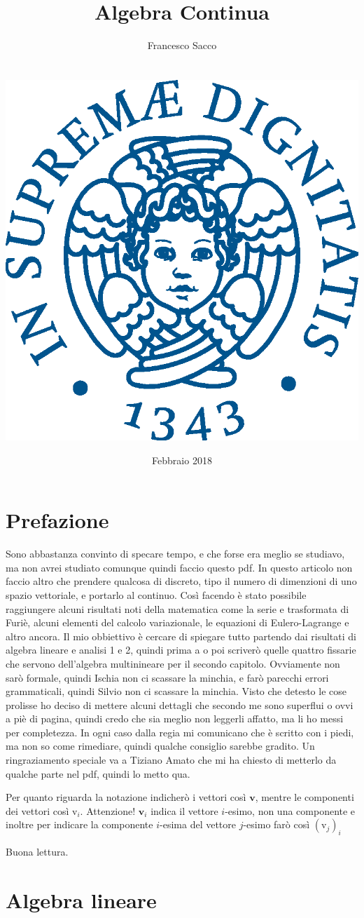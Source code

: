 \documentclass[11pt,a4paper]{report}
\date{{\LARGE Febbraio 2018}}
\title{{\myfont Algebra Continua}}
\author{{\Huge Francesco Sacco}\\ \\ \\
		\includegraphics[scale=0.6]{Immagini/cherubino.eps}\\}
\newcommand{\vettore}[1]{\mathbf{#1}}
\newcommand{\vettorec}[1]{\textrm{#1}}
\theoremstyle{definition}
\theoremstyle{plain}
\theoremstyle{plain}
\begin{document}
	\maketitle
	\tableofcontents
	\chapter*{Prefazione}
		Sono abbastanza convinto di specare tempo, e che forse era meglio se studiavo, ma non avrei studiato comunque quindi faccio questo pdf.\newline
		In questo articolo non faccio altro che prendere qualcosa di discreto, tipo il numero di dimenzioni di uno spazio vettoriale, e portarlo al continuo. Così facendo è stato possibile raggiungere alcuni risultati noti della matematica come la serie e trasformata di Furiè, alcuni elementi del calcolo variazionale, le equazioni di Eulero-Lagrange e altro ancora.\newline
		Il mio obbiettivo è cercare di spiegare tutto partendo dai risultati di algebra lineare e analisi 1 e 2, quindi prima a o poi scriverò quelle quattro fissarie che servono dell'algebra multinineare per il secondo capitolo.\newline
		Ovviamente non sarò formale, quindi Ischia non ci scassare la minchia, e farò parecchi errori grammaticali, quindi Silvio non ci scassare la minchia.\newline
		Visto che detesto le cose prolisse ho deciso di mettere alcuni dettagli che secondo me sono superflui o ovvi a piè di pagina, quindi credo che sia meglio non leggerli affatto, ma li ho messi per completezza.\newline
		In ogni caso dalla regia mi comunicano che è scritto con i piedi, ma non so come rimediare, quindi qualche consiglio sarebbe gradito.\newline
		Un ringraziamento speciale va a Tiziano Amato che mi ha chiesto di metterlo da qualche parte nel pdf, quindi lo metto qua.\newline

		Per quanto riguarda la notazione indicherò i vettori così $\vettore v$, mentre le componenti dei vettori così $\vettorec v_i$. Attenzione! $\vettore v_i$ indica il vettore $i$-esimo, non una componente e inoltre per indicare la componente $i$-esima del vettore $j$-esimo farò così $(\vettorec v_j)_i$\newline

		Buona lettura.
	
	\chapter{Algebra lineare}
\end{document}

